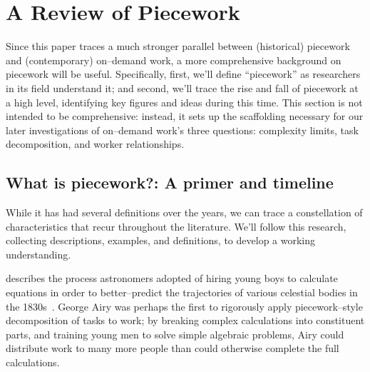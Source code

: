 \documentclass[trackingWork]{subfiles}
\begin{document}
\section{A Review of Piecework}

Since this paper traces a much stronger parallel between
(historical) piecework and (contemporary) on--demand work,
a more comprehensive background on piecework will be useful.
Specifically,
first, we'll define ``piecework'' as researchers in its field understand it;
and second, we'll trace the rise and fall of piecework at a high level,
identifying key figures and ideas during this time.
This section is not intended to be comprehensive:
instead, it sets up the scaffolding necessary for
our later investigations of on--demand work's three questions:
complexity limits,
task decomposition, and
worker relationships.




\subsection{What is piecework?: A primer and timeline}\label{sec:whatIsPiecework}

While it has had several definitions over the years,
we can trace a constellation of characteristics that recur throughout the literature.
We'll follow this research, collecting
descriptions,
examples, and
definitions,
to develop a working understanding.

\citeauthor{grier2013computers} describes the process astronomers adopted of hiring young boys
to calculate equations in order
to better--predict the trajectories of various celestial bodies in the 1830s~\cite{grier2013computers}.
George Airy was perhaps the first to rigorously apply piecework--style decomposition of tasks to work;
by breaking complex calculations into constituent parts, and
training young men to solve simple algebraic problems,
Airy could distribute work to many more people than could otherwise complete the full calculations.
\end{document}
